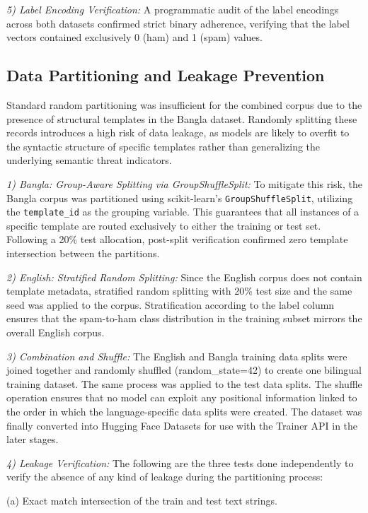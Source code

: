 \documentclass[journal]{IEEEtran}
\begin{document}
\textit{5) Label Encoding Verification:} A programmatic audit of the label encodings across both datasets confirmed strict binary adherence, verifying that the label vectors contained exclusively 0 (ham) and 1 (spam) values.

\subsection{Data Partitioning and Leakage Prevention}

Standard random partitioning was insufficient for the combined corpus due to the presence of structural templates in the Bangla dataset. Randomly splitting these records introduces a high risk of data leakage, as models are likely to overfit to the syntactic structure of specific templates rather than generalizing the underlying semantic threat indicators.

\textit{1) Bangla: Group-Aware Splitting via GroupShuffleSplit:} To mitigate this risk, the Bangla corpus was partitioned using scikit-learn's \texttt{GroupShuffleSplit}, utilizing the \texttt{template\_id} as the grouping variable. This guarantees that all instances of a specific template are routed exclusively to either the training or test set. Following a 20\% test allocation, post-split verification confirmed zero template intersection between the partitions.

\textit{2) English: Stratified Random Splitting:} Since the English corpus
does not contain template metadata, stratified random splitting with 20\%
test size and the same seed was applied to the corpus. Stratification
according to the label column ensures that the spam-to-ham class distribution in the training subset mirrors the overall English corpus.

\textit{3) Combination and Shuffle:} The English and Bangla training data
splits were joined together and randomly shuffled (random\_state=42) to
create one bilingual training dataset. The same process was applied to
the test data splits. The shuffle operation ensures that no model can
exploit any positional information linked to the order in
which the language-specific data splits were created. The dataset was
finally converted into Hugging Face Datasets for use with the Trainer
API in the later stages.

\textit{4) Leakage Verification:} The following are the three tests done
independently to verify the absence of any kind of leakage during the
partitioning process:

(a) Exact match intersection of the train and test text strings.
\end{document}
